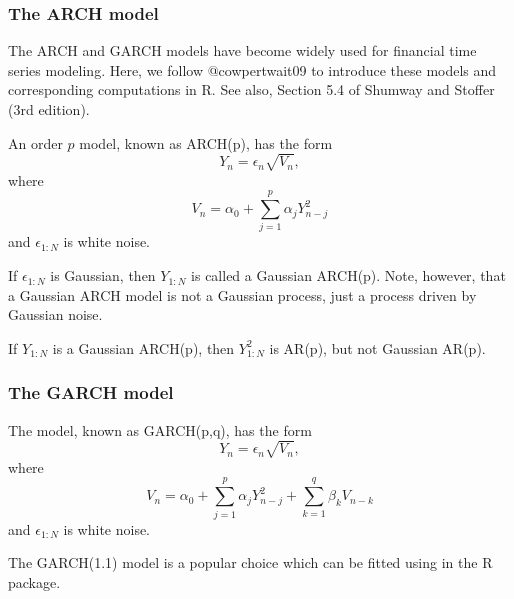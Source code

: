 \documentclass{beamer}\usepackage[]{graphicx}\usepackage[]{color}
\begin{document}
\begin{frame}[fragile]

\frametitle{The ARCH model}

\bi

\item The ARCH and GARCH models have become widely used for financial time series modeling. Here, we follow @cowpertwait09 to introduce these models and corresponding computations in R. See also, Section 5.4 of Shumway and Stoffer (3rd edition). 

\item An order $p$  model, known as ARCH(p), has the form
$$ Y_n = \epsilon_n \sqrt{V_n},$$
where
$$ V_n = \alpha_0 + \sum_{j=1}^p \alpha_j Y_{n-j}^2$$
and $\epsilon_{1:N}$ is white noise.

\item If $\epsilon_{1:N}$ is Gaussian, then $Y_{1:N}$ is called a Gaussian ARCH(p). Note, however, that a Gaussian ARCH model is not a Gaussian process, just a process driven by Gaussian noise.

\item If  $Y_{1:N}$ is a Gaussian ARCH(p), then  $Y_{1:N}^2$ is AR(p), but not Gaussian AR(p).

\ei

\end{frame}

\begin{frame}[fragile]

\frametitle{The GARCH model}

\bi

\item The  model, known as GARCH(p,q), has the form
$$ Y_n = \epsilon_n \sqrt{V_n},$$
where
$$ V_n = \alpha_0 + \sum_{j=1}^p \alpha_j Y_{n-j}^2 + \sum_{k=1}^q \beta_k V_{n-k}$$
and $\epsilon_{1:N}$ is white noise.


\item The GARCH(1.1) model is a popular choice \citep{cowpertwait09} which can be fitted using  in the  R package.

\ei

\end{frame}
\end{document}
